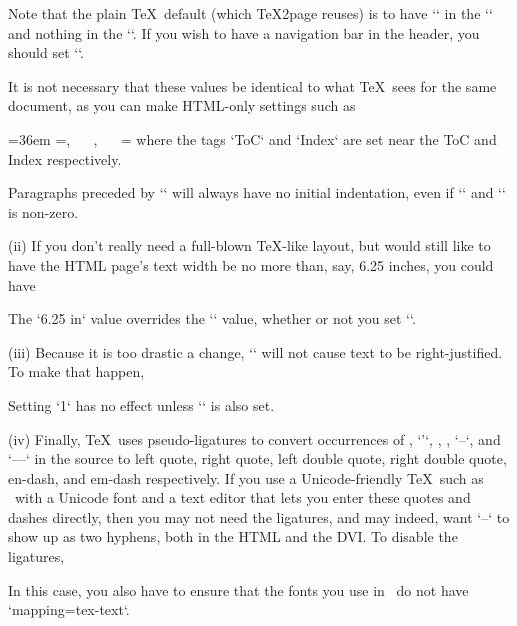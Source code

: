 Note that the plain \TeX\ default (which
\TeX2page reuses) is to have `\folio` in the
`\footline` and nothing in the `\headline`.  If you wish
to have a navigation bar in the header, you should set
`\headline`.

It is not necessary that these values be
identical to what \TeX\ sees for the same document, as you can
make HTML-only settings such as

%
\begintt
\ifx\shipout\UnDeFiNeD
  \hsize=36em
  \headline={\folio, ~~ , ~~ }
  \footline={\the\headline}  %
\fi
\endtt
%
 where the tags `ToC` and `Index` are set near
the ToC and Index respectively.

%
Paragraphs preceded by `\noindent` will always have no initial
indentation, even if `` and `\parskip` is
non-zero.

%
\item(ii) If you don’t really need a full-blown \TeX-like layout, but would
still like to have the HTML page’s text width be no more than,
say, 6.25 inches, you could have

\begintt
\def\TZPhsize{6.25 in}
\endtt
%
The `\TZPhsize` value overrides the `\hsize` value, whether
or not you set `\TZPtexlayout`.

\item(iii) Because it is too drastic a change, `` will not cause
text to be right-justified.  To make that happen,

\begintt
\let\TZPrightjustify=1
\endtt
%
Setting `\TZPrightjustify` has no effect unless `\TZPtexlayout` is
also set.

\item(iv) Finally, \TeX\ uses pseudo-ligatures to convert
occurrences of , `'`, , , `--`, and `---`
in the source to left quote, right quote, left double quote,
right double quote, en-dash, and em-dash respectively.
If you use a Unicode-friendly \TeX\ such as \XeTeX\ with a Unicode font
and a text editor that lets you enter these quotes and dashes directly,
then you may not need the ligatures, and may indeed, want `--` to
show up as two hyphens, both in the HTML and the DVI.  To
disable the ligatures,

\begintt
\let\TZPtextext=0
\endtt
%
In this case, you also have to ensure that the fonts you use in \XeTeX\ do not have `mapping=tex-text`.

